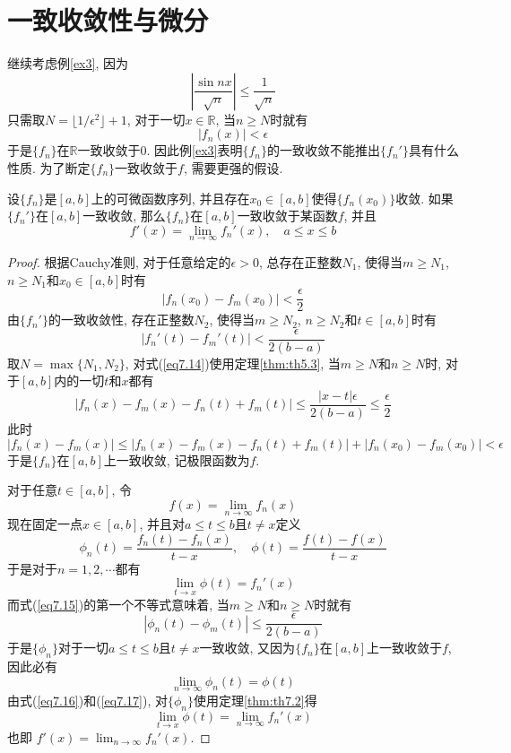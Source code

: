 \documentclass[cn,12pt,math=mtpro2,citestyle=gb7714-2015,bibstyle=gb7714-2015,twocol]{elegantbook}
\newcommand{\R}{\mathbb{R}}
\newcommand{\limn}{\lim_{n\to\infty}}
\begin{document}
\section{一致收敛性与微分}
继续考虑例\ref{ex3}, 因为
$$\left|\frac{\sin nx}{\sqrt{n}}\right|\leq \frac{1}{\sqrt{n}}$$
只需取$N=\lfloor 1/\epsilon^2 \rfloor+1$, 对于一切$x\in \R$, 当$n\geq N$时就有
$$|f_n(x)|<\epsilon$$
于是$\{f_n\}$在$\R$一致收敛于$0$. 因此例\ref{ex3}表明$\{f_n\}$的一致收敛不能推出$\{f_n'\}$具有什么性质. 为了断定$\{f_n\}$一致收敛于$f$, 需要更强的假设.
\begin{theorem}\label{thm:th7.9}
  设$\{f_n\}$是$[a,b]$上的可微函数序列, 并且存在$x_0\in[a,b]$使得$\{f_n(x_0)\}$收敛. 如果$\{f_n'\}$在$[a,b]$一致收敛, 那么$\{f_n\}$在$[a,b]$一致收敛于某函数$f$, 并且
  $$f'(x)=\limn f_n'(x),\quad a\leq x\leq b$$
\end{theorem}
\begin{proof}
  根据Cauchy准则, 对于任意给定的$\epsilon>0$, 总存在正整数$N_1$, 使得当$m\geq N_1$, $n\geq N_1$和$x_0\in[a,b]$时有
  \begin{equation}\label{eq7.13}
    |f_n(x_0)-f_m(x_0)|<\frac{\epsilon}{2}
  \end{equation}
  由$\{f_n'\}$的一致收敛性, 存在正整数$N_2$, 使得当$m\geq N_2$, $n\geq N_2$和$t\in[a,b]$时有
  \begin{equation}\label{eq7.14}
    |f_n'(t)-f_m'(t)|<\frac{\epsilon}{2(b-a)}
  \end{equation}
  取$N=\max\{N_1,N_2\}$, 对式(\ref{eq7.14})使用定理\ref{thm:th5.3}, 当$m\geq N$和$n\geq N$时, 对于$[a,b]$内的一切$t$和$x$都有
  \begin{equation}\label{eq7.15}
    |f_n(x)-f_m(x)-f_n(t)+f_m(t)|\leq\frac{|x-t|\epsilon}{2(b-a)}\leq\frac{\epsilon}{2}
  \end{equation}
  此时
  $$|f_n(x)-f_m(x)|\leq|f_n(x)-f_m(x)-f_n(t)+f_m(t)|+|f_n(x_0)-f_m(x_0)|<\epsilon$$
  于是$\{f_n\}$在$[a,b]$上一致收敛, 记极限函数为$f$.

  对于任意$t\in[a,b]$, 令
  $$f(x)=\limn f_n(x)$$
  现在固定一点$x\in[a,b]$, 并且对$a\leq t\leq b$且$t\neq x$定义
  $$\phi_n(t)=\frac{f_n(t)-f_n(x)}{t-x},\quad \phi(t)=\frac{f(t)-f(x)}{t-x}$$
  于是对于$n=1,2,\cdots$都有
  \begin{equation}\label{eq7.16}
    \lim_{t\to x}\phi(t)=f_n'(x)
  \end{equation}
  而式(\ref{eq7.15})的第一个不等式意味着, 当$m\geq N$和$n\geq N$时就有
  $$|\phi_n(t)-\phi_m(t)|\leq\frac{\epsilon}{2(b-a)}$$
  于是$\{\phi_n\}$对于一切$a\leq t\leq b$且$t\neq x$一致收敛, 又因为$\{f_n\}$在$[a,b]$上一致收敛于$f$, 因此必有
  \begin{equation}\label{eq7.17}
    \limn \phi_n(t)=\phi(t)
  \end{equation}
  由式(\ref{eq7.16})和(\ref{eq7.17}), 对$\{\phi_n\}$使用定理\ref{thm:th7.2}得
  $$\lim_{t\to x}\phi(t)=\limn f_n'(x)$$
  也即
  $f'(x)=\limn f_n'(x)$.

\end{proof}
\end{document}
